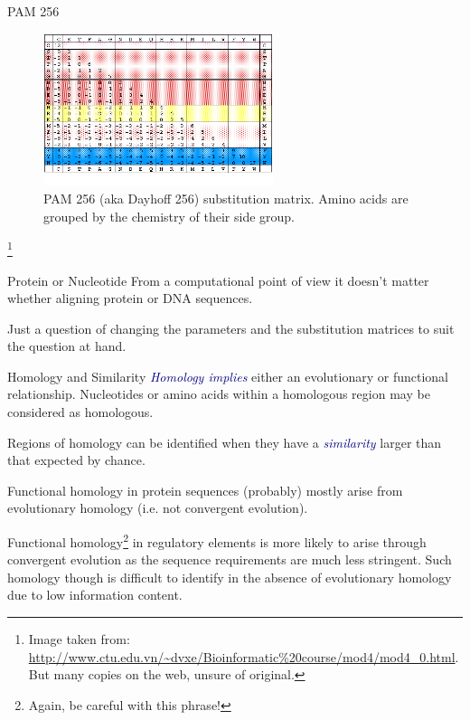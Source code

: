 \documentclass[pdf]{beamer}
\newcommand\blfootnote[1]{%
  \begingroup  %
  \renewcommand\thefootnote{}\footnote{#1}%
  \addtocounter{footnote}{-1}  %
  \endgroup
}
\begin{document}
\begin{frame}{PAM 256}
  \begin{figure}[ht]
    \includegraphics[width=0.6\textwidth]{images/dayhoff_256}
    \caption{  PAM 256 (aka Dayhoff 256) substitution matrix. Amino acids are
    grouped by the chemistry of their side group.}
  \end{figure}
  \blfootnote{Image taken from:
    \url{http://www.ctu.edu.vn/~dvxe/Bioinformatic\%20course/mod4/mod4_0.html}.\\
  But many copies on the web, unsure of original.}
\end{frame}

\begin{frame}{Protein or Nucleotide}
  From a computational point of view it doesn't matter whether aligning
  protein or DNA sequences. 

  Just a question of changing the parameters and the
  substitution matrices to suit the question at hand.

\end{frame}

\begin{frame}{Homology and Similarity}
  \textcolor{navy}{\emph{Homology implies}} either an evolutionary or functional
  relationship. Nucleotides or amino acids within a homologous
  region may be considered as homologous.

  Regions of homology can be identified when they have a \textcolor{navy}{\emph{similarity}}
  larger than that expected by chance.

  Functional homology in protein sequences (probably) mostly arise
  from evolutionary homology (i.e. not convergent evolution).

  Functional homology\footnote{Again, be careful with this phrase!} in regulatory elements is more likely to arise through
  convergent evolution as the sequence requirements are much less stringent.
  Such homology though is difficult to identify in the absence of evolutionary
  homology due to low information content.
  
\end{frame}
\end{document}
